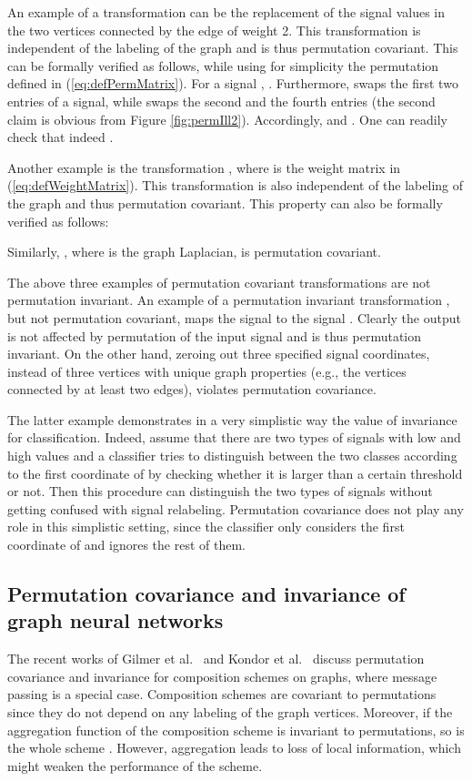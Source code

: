 \documentclass{article}
\begin{document}
An example of a transformation  can be the replacement of the signal values in the two vertices connected by the edge of weight 2. This transformation is independent of the labeling of the graph and is thus permutation covariant. This can be formally verified as follows, while using for simplicity the permutation  defined in (\ref{eq:defPermMatrix}). For a signal , . Furthermore,  swaps the first two entries of a signal, while  swaps the second and the fourth entries (the second claim is obvious from Figure \ref{fig:permIll2}). Accordingly,  and . One can readily check that indeed .

Another example is the transformation , where   is the weight matrix in (\ref{eq:defWeightMatrix}). This transformation is also independent of the labeling of the graph and thus permutation covariant. This property can also be formally verified as follows:

Similarly, , where   is the graph Laplacian, is permutation covariant.

The above three examples of permutation covariant transformations are not permutation invariant. An example of a permutation invariant transformation , but not permutation covariant, maps the signal  to the signal . Clearly the output  is not affected by permutation of the input signal and is thus permutation invariant. On the other hand, zeroing out three specified signal coordinates, instead of three vertices with unique graph properties (e.g., the vertices connected by at least two edges), violates permutation covariance. 

The latter example demonstrates in a very simplistic way the value of invariance for classification. Indeed, assume that there are two types of signals with low and high values and a classifier tries to distinguish between the two classes according to the first coordinate of  by checking whether it is larger than a certain threshold or not. Then this procedure can distinguish the two types of signals without getting confused with signal relabeling. Permutation covariance does not play any role in this simplistic setting, since the classifier only considers the first coordinate of  and ignores the rest of them. 

\subsection{Permutation covariance and invariance of graph neural networks}
\label{subsec:main_results_cov_inv}
The recent works of Gilmer et al.~\cite{GilSR17} and Kondor et al.~\cite{KonS18} discuss permutation covariance and invariance for composition schemes on graphs, where message passing is a special case. Composition schemes are covariant to permutations since they do not depend on any labeling of the graph vertices. Moreover, if the aggregation function {of the composition scheme} is invariant to permutations, so is the whole scheme \cite[Proposition 2]{KonS18}. {However, aggregation leads to loss of local information, which might weaken the performance of the scheme.} 
\end{document}
